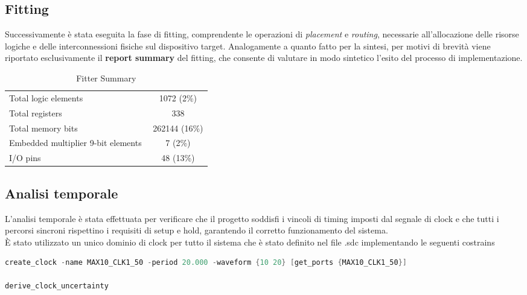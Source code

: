\documentclass[reprint,amsmath,amssymb,aps,rmp,twoside]{revtex4-2}
\begin{document}
\subsection{Fitting}

Successivamente è stata eseguita la fase di fitting, comprendente le operazioni di \textit{placement} e \textit{routing}, necessarie all’allocazione delle risorse logiche e delle interconnessioni fisiche sul dispositivo target. Analogamente a quanto fatto per la sintesi, per motivi di brevità viene riportato esclusivamente il \textbf{report summary} del fitting, che consente di valutare in modo sintetico l’esito del processo di implementazione.

\begin{table}[H]
\begin{ruledtabular}
    \begin{tabular}{l|c}
         Total logic elements&1072 (2\%)\\
         Total registers&338\\
         Total memory bits&262144 (16\%)\\
         Embedded multiplier 9-bit elements\,\,&7 (2\%)\\
         I/O pins&48 (13\%)\\
    \end{tabular}
    \caption{Fitter Summary}
    \label{tab:sintesi}
\end{ruledtabular}
\end{table}

\subsection{Analisi temporale}

L'analisi temporale è stata effettuata per verificare che il progetto soddisfi i vincoli di timing imposti dal segnale di clock e che tutti i percorsi sincroni rispettino i requisiti di setup e hold, garantendo il corretto funzionamento del sistema.\\
È stato utilizzato un unico dominio di clock per tutto il sistema che è stato definito nel file .sdc implementando le seguenti costrains\\

\begin{lstlisting}[language=Verilog, caption=File .scd relativo ai constraints di clock]
create_clock -name MAX10_CLK1_50 -period 20.000 -waveform {10 20} [get_ports {MAX10_CLK1_50}]

derive_clock_uncertainty
\end{lstlisting}
\end{document}
